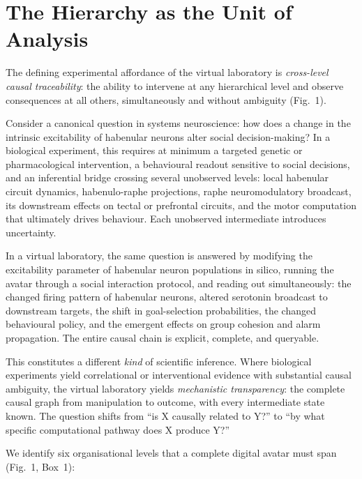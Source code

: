 \documentclass[12pt,a4paper]{article}
\begin{document}
\section*{The Hierarchy as the Unit of Analysis}

The defining experimental affordance of the virtual laboratory is
\emph{cross-level causal traceability}: the ability to intervene at
any hierarchical level and observe consequences at all others,
simultaneously and without ambiguity (Fig.~1).

Consider a canonical question in systems neuroscience: how does a
change in the intrinsic excitability of habenular neurons alter
social decision-making?
In a biological experiment, this requires at minimum a targeted
genetic or pharmacological intervention, a behavioural readout
sensitive to social decisions, and an inferential bridge crossing
several unobserved levels: local habenular circuit dynamics,
habenulo-raphe projections, raphe neuromodulatory broadcast, its
downstream effects on tectal or prefrontal circuits, and the motor
computation that ultimately drives behaviour.
Each unobserved intermediate introduces uncertainty.

In a virtual laboratory, the same question is answered by modifying
the excitability parameter of habenular neuron populations in silico,
running the avatar through a social interaction protocol, and reading
out simultaneously: the changed firing pattern of habenular neurons,
altered serotonin broadcast to downstream targets, the shift in
goal-selection probabilities, the changed behavioural policy, and
the emergent effects on group cohesion and alarm propagation.
The entire causal chain is explicit, complete, and queryable.

This constitutes a different \emph{kind} of scientific inference.
Where biological experiments yield correlational or interventional
evidence with substantial causal ambiguity, the virtual laboratory
yields \emph{mechanistic transparency}: the complete causal graph from
manipulation to outcome, with every intermediate state known.
The question shifts from ``is X causally related to Y?'' to
``by what specific computational pathway does X produce Y?''

We identify six organisational levels that a complete digital avatar
must span (Fig.~1, Box~1):
\end{document}
